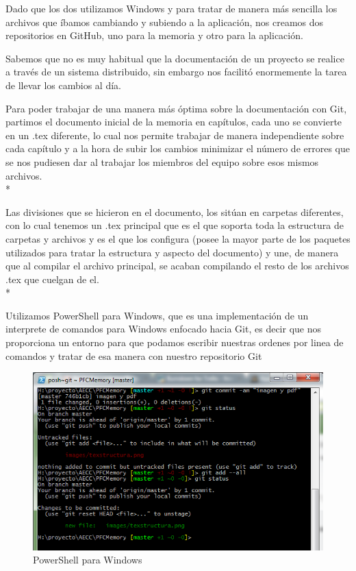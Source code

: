 \documentclass[../pfc.tex]{subfiles}
\begin{document}
	Dado que los dos utilizamos Windows y para tratar de manera más sencilla los archivos que íbamos cambiando y subiendo a la aplicación, nos creamos dos repositorios en GitHub, uno para la memoria y otro para la aplicación.
	
	Sabemos que no es muy habitual que la documentación de un proyecto se realice a través de un sistema distribuido, sin embargo nos facilitó enormemente la tarea de llevar los cambios al día.
	
	Para poder trabajar de una manera más óptima sobre la documentación con Git, partimos el documento inicial de la memoria en capítulos, cada uno se convierte en un .tex diferente, lo cual nos permite trabajar de manera independiente sobre cada capítulo y a la hora de subir los cambios minimizar el número de errores que se nos pudiesen dar al trabajar los miembros del equipo sobre esos mismos archivos.\\*
	
	Las divisiones que se hicieron en el documento, los sitúan en carpetas diferentes, con lo cual tenemos un .tex principal que es el que soporta toda la estructura de carpetas y archivos y es el que los configura (posee la mayor parte de los paquetes utilizados para tratar la estructura y aspecto del documento) y une, de manera que al compilar el archivo principal, se acaban compilando el resto de los archivos .tex que cuelgan de el.\\*
	
	Utilizamos PowerShell para Windows, que es una implementación de un interprete de comandos para Windows enfocado hacia Git, es decir que nos proporciona un entorno para que podamos escribir nuestras ordenes por linea de comandos y tratar de esa manera con nuestro repositorio Git
	
	\begin{figure}[H]
		\centering
		\includegraphics[width=0.9\linewidth]{../images/powershellcommit}
		\caption{PowerShell para Windows}
		\label{fig:powershellcommit}
	\end{figure}
	
\end{document}
